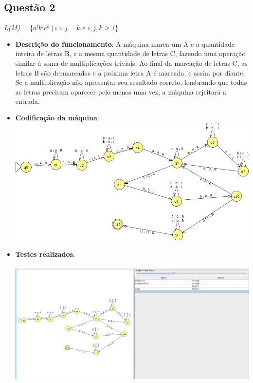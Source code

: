 \documentclass{article}
\begin{document}
\subsection*{Questão 2}
\textit{L(M)} = \{$a^{i}b^{j}c^{k}\ \vert\  i \times j = k $ e $i, j, k \geq 1$\}
\begin{itemize}
    \item \textbf{Descrição do funcionamento}: A máquina marca um A e a quantidade inteira de letras B, e a mesma quantidade de letras C, fazendo uma operação similar à soma de multiplicações triviais. Ao final da marcação de letras C, as letras B são desmarcadas e a próxima letra A é marcada, e assim por diante. Se a multiplicação não apresentar seu resultado correto, lembrando que todas as letras precisam aparecer pelo menos uma vez, a máquina rejeitará a entrada.
    \item \textbf{Codificação da máquina}: \\
    \includegraphics[scale=0.5]{questao2_ss.png}
	\item \textbf{Testes realizados}: \\ \\
    \includegraphics[width=\textwidth]{questao2_inputs.png}
\end{itemize}
\newpage
\end{document}
